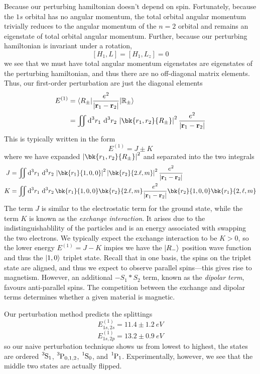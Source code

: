 Because our perturbing hamiltonian doesn't depend on spin. Fortunately, because the \(1s\) orbital has no angular momentum, the total orbital angular momentum trivially reduces to the angular momentum of the \(n=2\) orbital and remains an eigenstate of total orbital angular momentum. Further, because our perturbing hamiltonian is invariant under a rotation,
\[[H_1,L] = [H_1,L_z] = 0\]
we see that we must have total angular momentum eigenstates are eigenstates of the perturbing hamiltonian, and thus there are no off-diagonal matrix elements. Thus, our first-order perturbation are just the diagonal elements
\begin{align*}
	E^{(1)} &= \b{R_\pm}\frac{e^2}{\abs{\vb r_1-\vb r_2}}\k{\R_\pm}\\
		&= \iint\d[3]{r_1}\d[3]{r_2}\abs{\bk{r_1,r_2}{R_\pm}}^2\frac{e^2}{\abs{\vb r_1-\vb r_2}}
\end{align*}
This is typically written in the form
\begin{equation}
	E^{(1)}= J\pm K
\end{equation}
where we have expanded \(\abs{\bk{r_1,r_2}{R_\pm}}^2\) and separated into the two integrals
\begin{subequations}
	\begin{align}
		J&=\iint\d[3]{r_1}\d[3]{r_2} \abs{\bk{r_1}{1,0,0}}^2\abs{\bk{r_2}{2.\ell,m}}^2 \frac{e^2}{\abs{\vb r_1-\vb r_2}}\\
		K&=\iint\d[3]{r_1}\d[3]{r_2} \bk{r_1}{1,0,0}\bk{r_2}{2.\ell,m} \frac{e^2}{\abs{\vb r_1-\vb r_2}}\bk{r_2}{1,0,0}\bk{r_1}{2,\ell,m}
	\end{align}
\end{subequations}
The term \(J\) is similar to the electrostatic term for the ground state, while the term \(K\) is known as the \emph{exchange interaction}. It arises due to the indistinguishablility of the particles and is an energy associated with swapping the two electrons. We typically expect the exchange interaction to be \(K>0\), so the lower energy \(E^{(1)}= J-K\) impies we have the \(\lvert R_-\rangle\) position wave function and thus the \(\lvert1,0\rangle\) triplet state. Recall that in one basis, the spins on the triplet state are aligned, and thus we expect to observe parallel spins---this gives rise to magnetism. However, an additional \(-S_1*S_2\) term, known as the \emph{dipolar term}, favours anti-parallel spins. The competition between the exchange and dipolar terms determines whether a given material is magnetic.

Our perturbation method predicts the splittings
\[E_{1s,2s}^{(1)} = 11.4\pm\SI{1.2}{eV}\]
\[E_{1s,2p}^{(1)} = 13.2\pm\SI{0.9}{eV}\]
so our naive perturbation technique shows us from lowest to highest, the states are ordered \(\ce{^{3}S_1}\), \(\ce{^3P_{0,1,2}}\), \(\ce{^{1}S0}\), and \(\ce{^1P1}\). Experimentally, however, we see that the middle two states are actually flipped.

